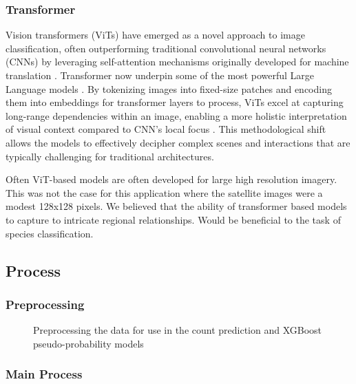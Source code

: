 \subsubsection{Transformer}
Vision transformers (ViTs) have emerged as a novel approach to image classification, often outperforming traditional convolutional neural networks (CNNs) by leveraging self-attention mechanisms originally developed for machine translation \cite{vaswani2017attention}. Transformer now underpin some of the most powerful Large Language models \cite{brown2020language}. By tokenizing images into fixed-size patches and encoding them into embeddings for transformer layers to process, ViTs excel at capturing long-range dependencies within an image, enabling a more holistic interpretation of visual context compared to CNN's local focus \cite{dosovitskiy2021image}. This methodological shift allows the models to effectively decipher complex scenes and interactions that are typically challenging for traditional architectures.

Often ViT-based models are often developed for large high resolution imagery. This was not the case for this application where the satellite images were a modest 128x128 pixels. We believed that the ability of transformer based models to capture to intricate regional relationships. Would be beneficial to the task of species classification.

\subsection{Process}

\subsubsection{Preprocessing}


\begin{figure}\label{fig:preproc}
    \begin{center}
        
        \caption{Preprocessing the data for use in the count prediction and XGBoost pseudo-probability models}
    \end{center}
\end{figure}



\subsubsection{Main Process}
\newcommand{\nspecies}{N_{\text{species}}}

